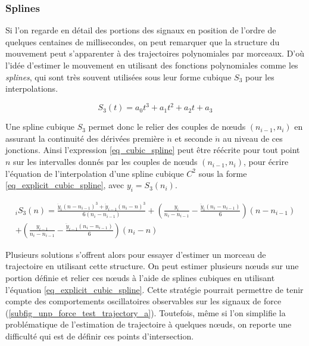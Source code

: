 

%

\subsubsection{Splines} \label{chap3_sec_method_sub_virt_traj_3}

Si l'on regarde en détail des portions des signaux en position de l'ordre de quelques centaines de millisecondes, on peut remarquer que la structure du mouvement peut s'apparenter à des trajectoires polynomiales par morceaux. D'où l'idée d'estimer le mouvement en utilisant des fonctions polynomiales comme les \emph{splines}, qui sont très souvent utilisées sous leur forme cubique $S_3$ pour les interpolations.

\begin{equation} \label{eq_cubic_spline}
S_3(t) = a_0 t^3 + a_1 t^2 + a_2 t + a_3
\end{equation}

Une spline cubique $S_3$ permet donc le relier des couples de nœuds $(n_{i-1}, n_i)$ en assurant la continuité des dérivées première $\dot{n}$ et seconde $\ddot{n}$ au niveau de ces jonctions. Ainsi l'expression \cref{eq_cubic_spline} peut être réécrite pour tout point $n$ sur les intervalles donnés par les couples de nœuds $(n_{i-1},n_i)$, pour écrire l'équation de l'interpolation d'une spline cubique $C^2$ sous la forme \cref{eq_explicit_cubic_spline}, avec $y_i = S_3(n_i)$.

\begin{multline}\label{eq_explicit_cubic_spline}
_iS_3(n) = \frac{\ddot{y}_i(n - n_{i-1})^3 + \ddot{y}_{i-1}(n_{i} - n)^3}{6(n_i - n_{i-1})} + \left( \frac{y_i}{n_i - n_{i-1}} - \frac{\ddot{y}_i(n_i - n_{i-1})}{6}\right)(n - n_{i-1})  \\ 
+ \left( \frac{y_{i-1}}{n_i - n_{i-1}} - \frac{\ddot{y}_{i-1}(n_i - n_{i-1})}{6}\right)(n_{i} - n)
\end{multline} 

Plusieurs solutions s'offrent alors pour essayer d'estimer un morceau de trajectoire en utilisant cette structure. On peut estimer plusieurs nœuds sur une portion définie et relier ces nœuds à l'aide de splines cubiques en utilisant l'équation \cref{eq_explicit_cubic_spline}. Cette stratégie pourrait permettre  de tenir compte des comportements oscillatoires observables sur les signaux de force (\cref{subfig_unp_force_test_trajectory_a}). Toutefois, même si l'on simplifie la problématique de l'estimation de trajectoire à quelques nœuds, on reporte une difficulté qui est de définir ces points d'intersection. 

